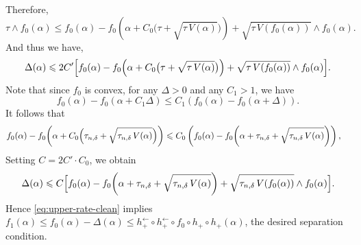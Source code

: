 \documentclass[english]{article}
\theoremstyle{plain}
\theoremstyle{definition}
\newcommand{\hupup}{h_+\mathbin{\circ}h_+}                 %
\newcommand{\hinvinv}{h_+^{\leftarrow}\mathbin{\circ}h_+^{\leftarrow}}  %
\newcommand{\mgn}[1]{\tau+\sqrt{\tau\,V(#1)}}
\newcommand{\fnull}{f_0}
\newcommand{\falt}{f_1}
\newcommand{\tauND}{\tau_{n,\delta}}               %
\begin{document}
\noindent Therefore,
\[
\tau \wedge \fnull(\alpha)
\leqslant
\fnull(\alpha) - \fnull\!\left(\alpha + C_0 \bigl(\mgn{\alpha}\bigr)\right)
+ \sqrt{\tau\,V(\fnull(\alpha))} \wedge \fnull(\alpha).
\]
And thus we have,
\[
\Delta(\alpha)
\leqslant
2C'\Bigl[
\fnull(\alpha)-\fnull\!\left(\alpha+C_0\bigl(\mgn{\alpha}\bigr)\right)
+\sqrt{\tau\,V(\fnull(\alpha))} \wedge \fnull (\alpha)
\Bigr].
\]
Note that since $\fnull$ is convex, for any $\Delta > 0$ and any $C_1 > 1$, we have
\[
\fnull(\alpha)-\fnull\!\left(\alpha+C_1\Delta\right)\leqslant C_1(\fnull(\alpha)-\fnull\!\left(\alpha+\Delta\right)).
\]
It follows that
\begin{align*}
\fnull(\alpha)-\fnull\!\left(\alpha+C_0\Bigl(\tauND+\sqrt{\tauND\,V(\alpha)}\Bigr)\right)
&\leqslant C_0\left( \fnull(\alpha)-\fnull\!\left(\alpha+\tauND+\sqrt{\tauND\,V(\alpha)}\right)\right),
\end{align*}
Setting $C = 2C'\cdot C_0$, we obtain
\begin{align}\label{eq:gap-upper-rate-proof}
\Delta(\alpha)
\leqslant
C \Bigl[
\fnull(\alpha) - \fnull\!\left(\alpha +\tauND+\sqrt{\tauND\,V(\alpha)}\right)
+ \sqrt{\tauND\, V(\fnull(\alpha))} \wedge \fnull(\alpha)
\Bigr].
\end{align}
Hence \eqref{eq:upper-rate-clean} implies $\falt(\alpha)\leqslant \fnull(\alpha)-\Delta(\alpha)\leqslant \hinvinv\circ \fnull\circ \hupup(\alpha)$, the desired separation condition.
\end{document}
